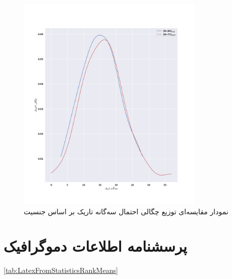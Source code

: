 \begin{figure}[htpb]
    \centering
    \includegraphics[width=0.8\textwidth]{./img/PDFGramDTRSex.png}
    \caption{نمودار مقایسه‌ای توزیع چگالی احتمال سه‌گانه تاریک بر اساس جنسیت}
    \label{fig:PDFGramDTRSex}
\end{figure}





\section{پرسشنامه اطلاعات دموگرافیک}

\eqref{tab:LatexFromStatisticsRankMeans}

